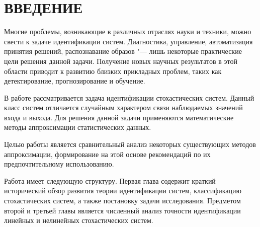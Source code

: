 \chapter*{ВВЕДЕНИЕ}

Многие проблемы, возникающие в различных отраслях науки и техники,
можно свести к задаче идентификации систем.
Диагностика, управление, автоматизация принятия решений, распознавание образов
"--- лишь некоторые практические цели решения данной задачи.
Получение новых научных результатов в этой области приводит к
развитию близких прикладных проблем,
таких как детектирование, прогнозирование и обучение.

В работе рассматривается задача идентификации стохастических систем.
Данный класс систем отличается случайным характером связи наблюдаемых
значений входа и выхода.
Для решения данной задачи применяются математические методы
аппроксимации статистических данных.

Целью работы является сравнительный анализ некоторых существующих методов аппроксимации,
формирование на этой основе рекомендаций по их предпочтительному использованию.

Работа имеет следующую структуру.
Первая глава содержит краткий исторический обзор развития теории идентификации систем,
классификацию стохастических систем, а также постановку задачи исследования.
Предметом второй и третьей главы является численный анализ точности идентификации
линейных и нелинейных стохастических систем.